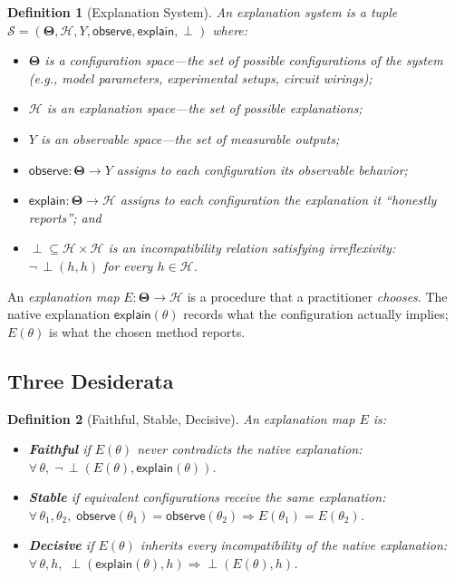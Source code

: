 \documentclass[twocolumn]{article}
\newtheorem{definition}{Definition}
\newcommand{\Params}{\mathbf{\Theta}}
\newcommand{\sH}{\mathcal{H}}
\newcommand{\incomp}{\perp}
\begin{document}
\begin{definition}[Explanation System]
\label{def:explanation-system}
An \emph{explanation system} is a tuple
$\mathcal{S} = (\Params, \sH, Y, \mathsf{observe}, \mathsf{explain}, \incomp)$
where:
\begin{itemize}
  \item $\Params$ is a \emph{configuration space}---the set of possible
    configurations of the system (e.g., model parameters, experimental
    setups, circuit wirings);
  \item $\sH$ is an \emph{explanation space}---the set of possible
    explanations;
  \item $Y$ is an \emph{observable space}---the set of measurable
    outputs;
  \item $\mathsf{observe}: \Params \to Y$ assigns to each configuration
    its observable behavior;
  \item $\mathsf{explain}: \Params \to \sH$ assigns to each
    configuration the explanation it ``honestly reports''; and
  \item $\incomp \subseteq \sH \times \sH$ is an \emph{incompatibility
    relation} satisfying \emph{irreflexivity}:
    $\neg\,\incomp(h,h)$ for every $h \in \sH$.
\end{itemize}
\end{definition}

An \emph{explanation map} $E : \Params \to \sH$ is a procedure that a
practitioner \emph{chooses}. The native explanation
$\mathsf{explain}(\theta)$ records what the configuration actually
implies; $E(\theta)$ is what the chosen method reports.

\subsection{Three Desiderata}

\begin{definition}[Faithful, Stable, Decisive]
\label{def:desiderata}
An explanation map $E$ is:
\begin{itemize}
  \item \textbf{Faithful} if $E(\theta)$ never contradicts the native
    explanation:
    $\forall\,\theta,\;\neg\,\incomp(E(\theta), \mathsf{explain}(\theta))$.
  \item \textbf{Stable} if equivalent configurations receive the same
    explanation:
    $\forall\,\theta_1, \theta_2,\;
    \mathsf{observe}(\theta_1) = \mathsf{observe}(\theta_2)
    \Rightarrow E(\theta_1) = E(\theta_2)$.
  \item \textbf{Decisive} if $E(\theta)$ inherits every incompatibility
    of the native explanation:
    $\forall\,\theta, h,\;
    \incomp(\mathsf{explain}(\theta), h)
    \Rightarrow \incomp(E(\theta), h)$.
\end{itemize}
\end{definition}
\end{document}
